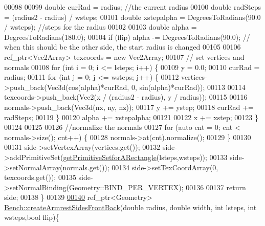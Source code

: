 \begin{DoxyCode}
00098         
00099         \textcolor{keywordtype}{double} curRad = radius; \textcolor{comment}{//the current radius}
00100         \textcolor{keywordtype}{double} radSteps = (radius2 - radius) / wsteps; 
00101         \textcolor{keywordtype}{double} xstepalpha = DegreesToRadians(90.0 / wsteps); \textcolor{comment}{//steps for the radius}
00102 
00103         \textcolor{keywordtype}{double} alpha = DegreesToRadians(180.0);
00104         \textcolor{keywordflow}{if} (flip)  alpha -= DegreesToRadians(90.0); \textcolor{comment}{// when this should be the other side, the start radius
       is changed }
00105         
00106         ref\_ptr<Vec2Array> texcoords = \textcolor{keyword}{new} Vec2Array;
00107         \textcolor{comment}{// set vertices and normals}
00108         \textcolor{keywordflow}{for} (\textcolor{keywordtype}{int} i = 0; i <= lsteps; i++) \{
00109             y = 0.0;
00110             curRad = radius;
00111             \textcolor{keywordflow}{for} (\textcolor{keywordtype}{int} j = 0; j <= wsteps; j++) \{
00112                 vertices->push\_back(Vec3d(cos(alpha)*curRad, 0, sin(alpha)*curRad));
00113                 
00114                 texcoords->push\_back(Vec2(x / (radius2 - radius), y / radius));
00115                 
00116                 normals->push\_back(Vec3d(nx, ny, nz));
00117                 y += ystep;
00118                 curRad += radSteps;
00119             \}
00120             alpha += xstepalpha;
00121 
00122             x += xstep;
00123         \}
00124 
00125         
00126         \textcolor{comment}{//normalize the normals}
00127         \textcolor{keywordflow}{for} (\textcolor{keyword}{auto} cnt = 0; cnt < normals->size(); cnt++) \{
00128             normals->at(cnt).normalize();
00129         \}
00130 
00131         side->setVertexArray(vertices.get());
00132         side->addPrimitiveSet(\hyperlink{classbrtr_1_1_bench_a90c4ae616eb8d7bf669af2983ed3cd1d}{getPrimitiveSetforARectangle}(lsteps,wsteps));
00133         side->setNormalArray(normals.get());
00134         side->setTexCoordArray(0, texcoords.get());
00135         side->setNormalBinding(Geometry::BIND\_PER\_VERTEX);
00136 
00137         \textcolor{keywordflow}{return} side;
00138     \}   
00139 
\hypertarget{_bench_8cpp_source_l00140}{}\hyperlink{classbrtr_1_1_bench_a28443b856188050680a2c0ab4ad31a93}{00140}     ref\_ptr<Geometry> \hyperlink{classbrtr_1_1_bench_a28443b856188050680a2c0ab4ad31a93}{Bench::createArmrestSidesFrontBack}(\textcolor{keywordtype}{double} radius, \textcolor{keywordtype}{
      double} width, \textcolor{keywordtype}{int} lsteps, \textcolor{keywordtype}{int} wsteps,\textcolor{keywordtype}{bool} flip)\{

\end{DoxyCode}
